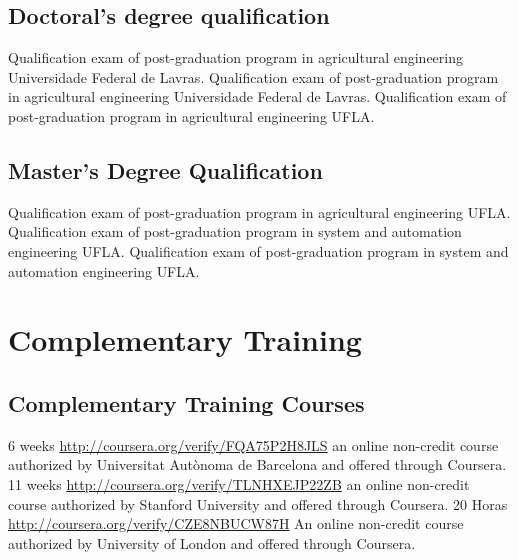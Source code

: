 \documentclass[11pt,a4paper,sans]{moderncv} %
\begin{document}
\subsection{Doctoral's degree qualification}
			{}
			{Qualification exam of post-graduation program  in agricultural engineering}{}
			{Universidade Federal de Lavras.}
			{}
			{Qualification exam of post-graduation program  in agricultural engineering}{}
			{Universidade Federal de Lavras.}
			{}
			{Qualification exam of post-graduation program  in agricultural engineering}{}
			{UFLA. }

\subsection{Master's Degree Qualification}
			{}
			{Qualification exam of post-graduation program  in agricultural engineering}{}
			{UFLA.}
			{}
			{Qualification exam of post-graduation program  in system and automation engineering}{}
			{UFLA.}
			{}
			{Qualification exam of post-graduation program  in system and automation engineering}{}
			{UFLA. }



\section{Complementary Training}

\subsection{Complementary Training Courses}
	      {6 weeks}
	      {\url{http://coursera.org/verify/FQA75P2H8JLS}}{}
	      {an online non-credit course authorized by Universitat Autònoma de Barcelona and offered through Coursera.}
	      {11 weeks}
	      {\url{http://coursera.org/verify/TLNHXEJP22ZB}}{}
	      {an online non-credit course authorized by Stanford University and offered through Coursera.}
	      {20 Horas}
	      {\url{http://coursera.org/verify/CZE8NBUCW87H}}{}
	      {An online non-credit course authorized by University of London and offered through Coursera.}
\end{document}
